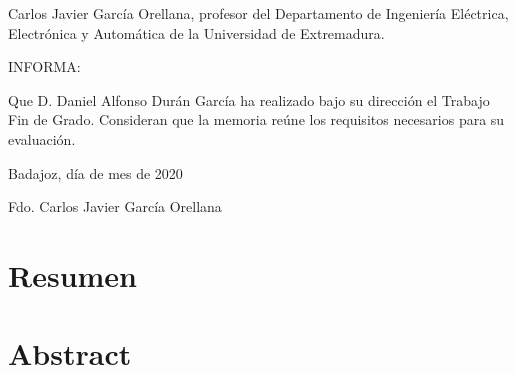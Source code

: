 \documentclass[12pt,dvipsnames,a4paper,twoside]{article}
\begin{document}


\shipout\null %

\pagestyle{empty}
\vspace*{5cm}

Carlos Javier García Orellana, profesor del
Departamento de Ingeniería Eléctrica, Electrónica y Automática de la Universidad de
Extremadura.

INFORMA:

Que D. Daniel Alfonso Durán García ha realizado
bajo su dirección el Trabajo Fin de Grado. Consideran que la memoria reúne
los requisitos necesarios para su evaluación.

\vspace*{1cm}
\begin{center}
Badajoz, día de mes de 2020


\vspace{5cm}
Fdo. Carlos Javier García Orellana
\end{center}

\newpage %
\setcounter{page}{1}
\pagestyle{plain}

\tableofcontents



\newpage
\section*{Resumen}




\section*{Abstract}




\end{document}
